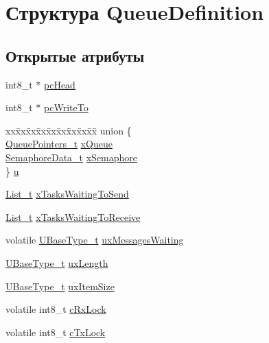 \hypertarget{struct_queue_definition}{}\section{Структура Queue\+Definition}
\label{struct_queue_definition}
\subsection*{Открытые атрибуты}
\begin{DoxyCompactItemize}
\item 
int8\+\_\+t $\ast$ \mbox{\hyperlink{struct_queue_definition_a487dc7e43b380c58212cba72bc33e0ed}{pc\+Head}}
\item 
int8\+\_\+t $\ast$ \mbox{\hyperlink{struct_queue_definition_abdf13cc013c8488848cee3fce4f0fed3}{pc\+Write\+To}}
\item 
\begin{tabbing}
xx\=xx\=xx\=xx\=xx\=xx\=xx\=xx\=xx\=\kill
union \{\\
\>\mbox{\hyperlink{queue_8c_ad04ba6edfecdbdee6406cdd62a72671c}{QueuePointers\_t}} \mbox{\hyperlink{struct_queue_definition_aea4a2daf33054ff6b535f158bd4007f0}{xQueue}}\\
\>\mbox{\hyperlink{queue_8c_a37643b46fd5893e70242848a22aef310}{SemaphoreData\_t}} \mbox{\hyperlink{struct_queue_definition_adb2c0818274974553c619ff953b6f477}{xSemaphore}}\\
\} \mbox{\hyperlink{struct_queue_definition_a5585eb362923d4e4adfcd0b7b63b2eee}{u}}\\

\end{tabbing}\item 
\mbox{\hyperlink{list_8h_afd590ef6400071b4d63d65ef90bea7f4}{List\+\_\+t}} \mbox{\hyperlink{struct_queue_definition_aaab135c4345cb0393d6ff3cd5164c7b2}{x\+Tasks\+Waiting\+To\+Send}}
\item 
\mbox{\hyperlink{list_8h_afd590ef6400071b4d63d65ef90bea7f4}{List\+\_\+t}} \mbox{\hyperlink{struct_queue_definition_af6d61526f77beee659cd604a0c473359}{x\+Tasks\+Waiting\+To\+Receive}}
\item 
volatile \mbox{\hyperlink{portmacro_8h_a646f89d4298e4f5afd522202b11cb2e6}{U\+Base\+Type\+\_\+t}} \mbox{\hyperlink{struct_queue_definition_a12b07a40152d0f21488ca06d362d13d1}{ux\+Messages\+Waiting}}
\item 
\mbox{\hyperlink{portmacro_8h_a646f89d4298e4f5afd522202b11cb2e6}{U\+Base\+Type\+\_\+t}} \mbox{\hyperlink{struct_queue_definition_ae80d17a812c669d4d41265b7f693988c}{ux\+Length}}
\item 
\mbox{\hyperlink{portmacro_8h_a646f89d4298e4f5afd522202b11cb2e6}{U\+Base\+Type\+\_\+t}} \mbox{\hyperlink{struct_queue_definition_a81bb7d3826909244baa9debf5a55abb0}{ux\+Item\+Size}}
\item 
volatile int8\+\_\+t \mbox{\hyperlink{struct_queue_definition_ac750a3f75a6e174adbc697e473a0dd13}{c\+Rx\+Lock}}
\item 
volatile int8\+\_\+t \mbox{\hyperlink{struct_queue_definition_a24ac3f0707f098da2a22244d843fcf82}{c\+Tx\+Lock}}
\end{DoxyCompactItemize}


